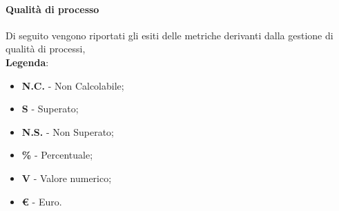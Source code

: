 	\paragraph{Qualità di processo}
		Di seguito vengono riportati gli esiti delle metriche derivanti dalla gestione di qualità di processi, \\
\textbf{Legenda}:
\begin{itemize}
	\item \textbf{N.C.} - Non Calcolabile;
	\item \textbf{S} - Superato;
	\item \textbf{N.S.} - Non Superato;
	\item \textbf{\%} - Percentuale;
	\item \textbf{V} - Valore numerico;
	\item \textbf{\euro{}} - Euro.
\end{itemize}
